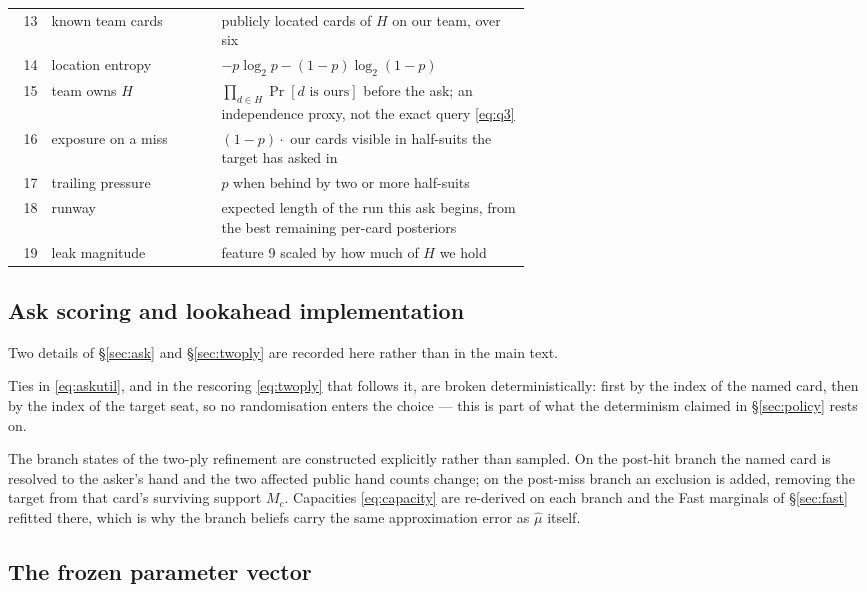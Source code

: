 \documentclass[11pt]{article}
\theoremstyle{definition}
\begin{document}
\begin{table}[ht]
\begin{tabular}{rlp{0.60\linewidth}}
13 & known team cards    & publicly located cards of $H$ on our team, over six \\
14 & location entropy    & $-p\log_2 p - (1-p)\log_2(1-p)$ \\
15 & team owns $H$       & $\prod_{d \in H}\Pr[d \text{ is ours}]$ before the ask; an independence proxy, not the exact query \eqref{eq:q3} \\
16 & exposure on a miss  & $(1-p)\cdot$ our cards visible in half-suits the target has asked in \\
17 & trailing pressure   & $p$ when behind by two or more half-suits \\
18 & runway              & expected length of the run this ask begins, from the best remaining per-card posteriors \\
19 & leak magnitude      & feature 9 scaled by how much of $H$ we hold \\
\bottomrule
\end{tabular}
\end{table}

\subsection{Ask scoring and lookahead implementation}
\label{app:params-ask}

Two details of \S\ref{sec:ask} and \S\ref{sec:twoply} are recorded here rather
than in the main text.

Ties in \eqref{eq:askutil}, and in the rescoring \eqref{eq:twoply} that follows
it, are broken deterministically: first by the index of the named card, then by
the index of the target seat, so no randomisation enters the choice --- this is
part of what the determinism claimed in \S\ref{sec:policy} rests on.

The branch states of the two-ply refinement are constructed explicitly rather
than sampled. On the post-hit branch the named card is resolved to the asker's
hand and the two affected public hand counts change; on the post-miss branch an
exclusion is added, removing the target from that card's surviving support $M_c$.
Capacities \eqref{eq:capacity} are re-derived on each branch and the Fast
marginals of \S\ref{sec:fast} refitted there, which is why the branch beliefs
carry the same approximation error as $\hat\mu$ itself.

\subsection{The frozen parameter vector}
\end{document}
